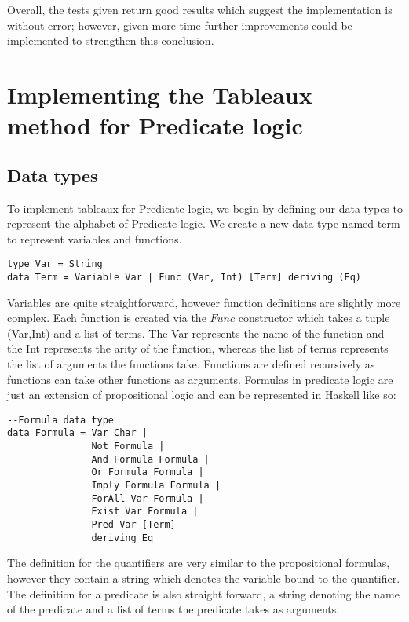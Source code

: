 \documentclass{article}%
\begin{document}
Overall, the tests given return good results which suggest the implementation is without error; however, given more time further improvements could be implemented to strengthen this conclusion. 
\section{Implementing the Tableaux method for Predicate logic}
\subsection{Data types} 
To implement tableaux for Predicate logic, we begin by defining our data types to represent the alphabet of Predicate logic. We create a new data type named term to represent variables and functions.
\begin{verbatim}
type Var = String 
data Term = Variable Var | Func (Var, Int) [Term] deriving (Eq)  
\end{verbatim}
Variables are quite straightforward, however function definitions are slightly more complex. Each function is created via the $Func$ constructor which takes a tuple (Var,Int) and a list of terms. The Var represents the name of the function and the Int represents the arity of the function, whereas the list of terms represents the list of arguments the functions take. Functions are defined recursively as functions can take other functions as arguments. 
Formulas in predicate logic are just an extension of propositional logic and can be represented in Haskell like so: 
\begin{verbatim}
--Formula data type
data Formula = Var Char |
               Not Formula | 
               And Formula Formula | 
               Or Formula Formula | 
               Imply Formula Formula | 
               ForAll Var Formula |
               Exist Var Formula |
               Pred Var [Term]
               deriving Eq
\end{verbatim}
The definition for the quantifiers are very similar to the propositional formulas, however they contain a string which denotes the variable bound to the quantifier. The definition for a predicate is also straight forward, a string denoting the name of the predicate and a list of terms the predicate takes as arguments. 
\end{document}
